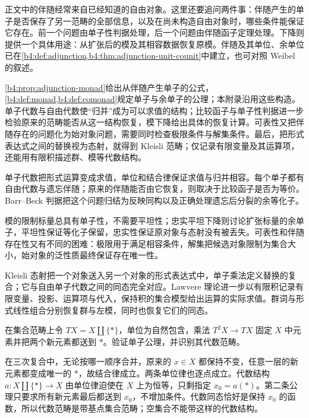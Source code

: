 \ProseParagraphBreak
正文中的伴随经常来自已经知道的自由对象。这里还要追问两件事：伴随产生的单子是否保存了另一范畴的全部信息，以及在尚未构造自由对象时，哪些条件能保证它存在。前一个问题由单子性判据处理，后一个问题由伴随函子定理处理。下降则提供一个具体用途：从扩张后的模及其相容数据恢复原模。伴随及其单位、余单位已在\cref{b4:def:adjunction,b4:thm:adjunction-unit-counit}中建立，也可对照 Weibel 的叙述\cite[A.6.1; Theorem A.6.2, pp. 429--431]{Weibel1994HomologicalAlgebra}。

\ProseParagraphBreak
\cref{b4:prop:adjunction-monad}给出从伴随产生单子的公式，\cref{b4:def:monad,b4:def:comonad}规定单子与余单子的公理；本附录沿用这些构造。单子代数与自由代数使“归并”成为可以求值的结构；比较函子与单子性判据进一步检验原来的范畴能否从这一结构恢复，模下降给出具体的恢复计算。可表性又把伴随存在的问题化为始对象问题，需要同时检查极限条件与解集条件。最后，把形式表达式之间的替换视为态射，就得到 Kleisli 范畴；仅记录有限变量及其运算项，还能用有限积描述群、模等代数结构。







\begin{chaptersummary}
	单子代数把形式运算变成求值，单位和结合律保证求值与归并相容。每个单子都有自由代数与遗忘伴随；原来的伴随能否由它恢复，则取决于比较函子是否为等价。Barr–Beck 判据把这个问题归结为反映同构以及正确处理遗忘后分裂的余等化子。

	\ProseParagraphBreak

	模的限制标量总具有单子性，不需要平坦性；忠实平坦下降则讨论扩张标量的余单子，平坦性保证等化子保留，忠实性保证原对象与态射没有被丢失。可表性和伴随存在性又有不同的困难：极限用于满足相容条件，解集把候选对象限制为集合大小，始对象的泛性质最终保证存在唯一性。

	\ProseParagraphBreak
	Kleisli 态射把一个对象送入另一个对象的形式表达式中，单子乘法定义替换的复合；它与自由单子代数之间的同态完全对应。Lawvere 理论进一步以有限积记录有限变量、投影、运算项与代入，保持积的集合模型给出运算的实际求值。群词与形式线性组合分别恢复群与左模，同时也恢复它们的同态。
\end{chaptersummary}

\BookExercises

\begin{exercise}\label{b4:ex:A-pointed-monad}
	在集合范畴上令 \(TX=X\amalg\{*\}\)，单位为自然包含，乘法 \(T^2X\to TX\) 固定 \(X\) 中元素并把两个新元素都送到 \(*\)。验证单子公理，并识别其代数范畴。
\end{exercise}
\begin{solution}
	在三次复合中，无论按哪一顺序合并，原来的 \(x\in X\) 都保持不变，任意一层的新元素都变成唯一的 \(*\)，故结合律成立。两条单位律也逐点成立。代数结构 \(a:X\amalg\{*\}\to X\) 由单位律迫使在 \(X\) 上为恒等，只剩指定 \(x_0=a(*)\)。第二条公理只要求所有新元素最后都送到 \(x_0\)，不增加条件。代数同态恰好是保持 \(x_0\) 的函数，所以代数范畴是带基点集合范畴；空集合不能带这样的代数结构。
\end{solution}

